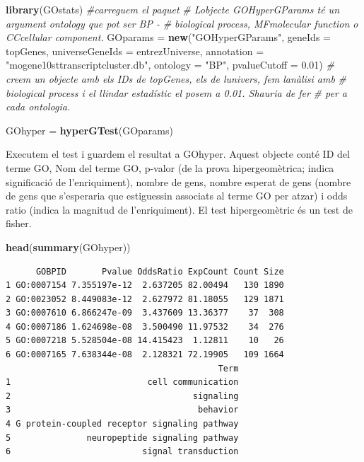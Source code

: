 \documentclass[
]{article}
\newenvironment{Shaded}{\begin{snugshade}}{\end{snugshade}}
\newcommand{\AttributeTok}[1]{\textcolor[rgb]{0.13,0.29,0.53}{#1}}
\newcommand{\CommentTok}[1]{\textcolor[rgb]{0.56,0.35,0.01}{\textit{#1}}}
\newcommand{\FloatTok}[1]{\textcolor[rgb]{0.00,0.00,0.81}{#1}}
\newcommand{\FunctionTok}[1]{\textcolor[rgb]{0.13,0.29,0.53}{\textbf{#1}}}
\newcommand{\NormalTok}[1]{#1}
\newcommand{\OtherTok}[1]{\textcolor[rgb]{0.56,0.35,0.01}{#1}}
\newcommand{\StringTok}[1]{\textcolor[rgb]{0.31,0.60,0.02}{#1}}
\begin{document}
\begin{Shaded}
\begin{Highlighting}[]
\FunctionTok{library}\NormalTok{(GOstats)  }\CommentTok{\#carreguem el paquet}
\CommentTok{\# L\textquotesingle{}objecte GOHyperGParams té un argument ontology que pot ser \textquotesingle{}BP\textquotesingle{} {-}}
\CommentTok{\# biological process, \textquotesingle{}MF\textquotesingle{}{-}molecular function o \textquotesingle{}CC\textquotesingle{}{-}cellular component.}
\NormalTok{GOparams }\OtherTok{=} \FunctionTok{new}\NormalTok{(}\StringTok{"GOHyperGParams"}\NormalTok{, }\AttributeTok{geneIds =}\NormalTok{ topGenes, }\AttributeTok{universeGeneIds =}\NormalTok{ entrezUniverse,}
    \AttributeTok{annotation =} \StringTok{"mogene10sttranscriptcluster.db"}\NormalTok{, }\AttributeTok{ontology =} \StringTok{"BP"}\NormalTok{, }\AttributeTok{pvalueCutoff =} \FloatTok{0.01}\NormalTok{)}
\CommentTok{\# creem un objecte amb els IDs de topGenes, els de l\textquotesingle{}univers, fem l\textquotesingle{}anàlisi amb}
\CommentTok{\# biological process i el llindar estadístic el posem a 0.01.  S\textquotesingle{}hauria de fer}
\CommentTok{\# per a cada ontologia.}
\end{Highlighting}
\end{Shaded}

\begin{Shaded}
\begin{Highlighting}[]
\NormalTok{GOhyper }\OtherTok{=} \FunctionTok{hyperGTest}\NormalTok{(GOparams)}
\end{Highlighting}
\end{Shaded}

Executem el test i guardem el resultat a GOhyper. Aquest objecte conté
ID del terme GO, Nom del terme GO, p-valor (de la prova hipergeomètrica;
indica significació de l'enriquiment), nombre de gens, nombre esperat de
gens (nombre de gens que s'esperaria que estiguessin associats al terme
GO per atzar) i odds ratio (indica la magnitud de l'enriquiment). El
test hipergeomètric és un test de fisher.

\begin{Shaded}
\begin{Highlighting}[]
\FunctionTok{head}\NormalTok{(}\FunctionTok{summary}\NormalTok{(GOhyper))}
\end{Highlighting}
\end{Shaded}

\begin{verbatim}
      GOBPID       Pvalue OddsRatio ExpCount Count Size
1 GO:0007154 7.355197e-12  2.637205 82.00494   130 1890
2 GO:0023052 8.449083e-12  2.627972 81.18055   129 1871
3 GO:0007610 6.866247e-09  3.437609 13.36377    37  308
4 GO:0007186 1.624698e-08  3.500490 11.97532    34  276
5 GO:0007218 5.528504e-08 14.415423  1.12811    10   26
6 GO:0007165 7.638344e-08  2.128321 72.19905   109 1664
                                          Term
1                           cell communication
2                                    signaling
3                                     behavior
4 G protein-coupled receptor signaling pathway
5               neuropeptide signaling pathway
6                          signal transduction
\end{verbatim}
\end{document}
